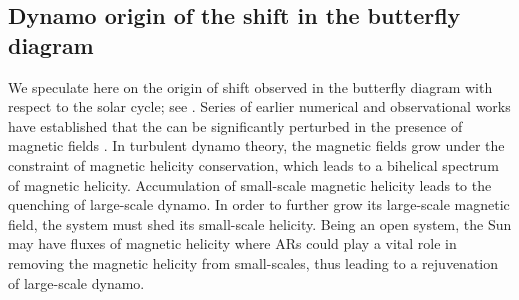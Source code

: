 \documentclass{aa}
\begin{document}

\subsection{Dynamo origin of the shift in the \fff butterfly diagram}
We speculate here on the origin of shift observed in the \fff butterfly diagram
with respect to the solar cycle; see .
Series of earlier numerical and observational works have established that the \fff can be
significantly perturbed in the presence of magnetic fields \citep{S+14,S+15,SRB16,S+20}.
In turbulent dynamo theory, the magnetic fields grow under the constraint of magnetic helicity
conservation, which leads to a bihelical spectrum of magnetic helicity. Accumulation of small-scale
magnetic helicity leads to the quenching of large-scale dynamo. In order to further grow its large-scale
magnetic field, the system must shed its small-scale helicity. Being an open system, the Sun
may have fluxes of magnetic helicity where ARs could play a vital role in removing the magnetic
helicity from small-scales, thus leading to a rejuvenation of large-scale dynamo.
\end{document}
